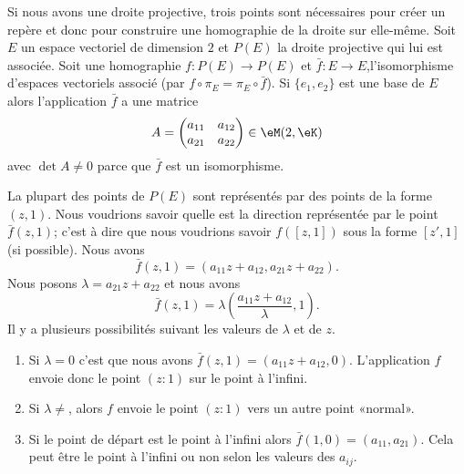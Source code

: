 \begin{normaltext}
    Si nous avons une droite projective, trois points sont nécessaires pour créer un repère et donc pour construire une homographie de la droite sur elle-même. Soit \( E\) un espace vectoriel de dimension \( 2\) et \( P(E)\) la droite projective qui lui est associée. Soit une homographie \( f\colon P(E)\to P(E)\) et \( \bar f\colon E\to E\),l'isomorphisme d'espaces vectoriels associé (par \( f\circ\pi_E=\pi_E\circ \bar f\)). Si \( \{ e_1,e_2 \}\) est une base de $E$ alors l'application \( \bar f\) a une matrice
    \begin{equation}
        A=\begin{pmatrix}
            a_{11}    &   a_{12}    \\ 
            a_{21}    &   a_{22}    
        \end{pmatrix}\in \eM(2,\eK)
    \end{equation}
    avec \( \det A\neq 0\) parce que \( \bar f\) est un isomorphisme.

    La plupart des points de \( P(E)\) sont représentés par des points de la forme \( (z,1)\). Nous voudrions savoir quelle est la direction représentée par le point \( \bar f(z,1)\); c'est à dire que nous voudrions savoir \( f([z,1])\) sous la forme \( [z',1]\) (si possible). Nous avons
    \begin{equation}
        \bar f(z,1)=(a_{11}z+a_{12},a_{21}z+a_{22}).
    \end{equation}
    Nous posons \( \lambda=a_{21}z+a_{22}\) et nous avons
    \begin{equation}
        \bar f(z,1)=\lambda\left( \frac{ a_{11}z+a_{12} }{ \lambda },1 \right).
    \end{equation}
    Il y a plusieurs possibilités suivant les valeurs de \( \lambda\) et de \( z\).

    \begin{enumerate}
        \item
            Si \( \lambda=0\) c'est que nous avons \( \bar f(z,1)=(a_{11}z+a_{12},0)\). L'application \( f\) envoie donc le point \( (z:1)\) sur le point à l'infini.
        \item
            Si \( \lambda\neq \), alors \( f\) envoie le point \( (z:1)\) vers un autre point «normal».
        \item
            Si le point de départ est le point à l'infini alors \( \bar f(1,0)=(a_{11},a_{21})\). Cela peut être le point à l'infini ou non selon les valeurs des \( a_{ij}\).
    \end{enumerate}


\end{normaltext}

